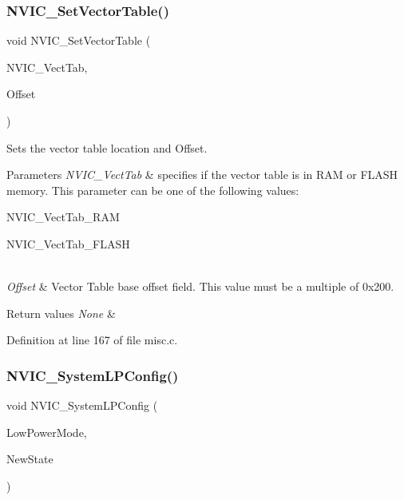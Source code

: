 \subsubsection{\texorpdfstring{N\+V\+I\+C\+\_\+\+Set\+Vector\+Table()}{NVIC\_SetVectorTable()}}
{\footnotesize\ttfamily void N\+V\+I\+C\+\_\+\+Set\+Vector\+Table (\begin{DoxyParamCaption}\item[{uint32\+\_\+t}]{N\+V\+I\+C\+\_\+\+Vect\+Tab,  }\item[{uint32\+\_\+t}]{Offset }\end{DoxyParamCaption})}



Sets the vector table location and Offset. 


\begin{DoxyParams}{Parameters}
{\em N\+V\+I\+C\+\_\+\+Vect\+Tab} & specifies if the vector table is in R\+AM or F\+L\+A\+SH memory. This parameter can be one of the following values\+: \begin{DoxyItemize}
\item N\+V\+I\+C\+\_\+\+Vect\+Tab\+\_\+\+R\+AM \item N\+V\+I\+C\+\_\+\+Vect\+Tab\+\_\+\+F\+L\+A\+SH \end{DoxyItemize}
\\
\hline
{\em Offset} & Vector Table base offset field. This value must be a multiple of 0x200. \\
\hline
\end{DoxyParams}

\begin{DoxyRetVals}{Return values}
{\em None} & \\
\hline
\end{DoxyRetVals}


Definition at line 167 of file misc.\+c.

\mbox{\label{group___m_i_s_c___exported___functions_gae21011c5232f5b8f366acbecd12a1d4a}} 
\subsubsection{\texorpdfstring{N\+V\+I\+C\+\_\+\+System\+L\+P\+Config()}{NVIC\_SystemLPConfig()}}
{\footnotesize\ttfamily void N\+V\+I\+C\+\_\+\+System\+L\+P\+Config (\begin{DoxyParamCaption}\item[{uint8\+\_\+t}]{Low\+Power\+Mode,  }\item[{\hyperlink{group___exported__types_gac9a7e9a35d2513ec15c3b537aaa4fba1}{Functional\+State}}]{New\+State }\end{DoxyParamCaption})}




